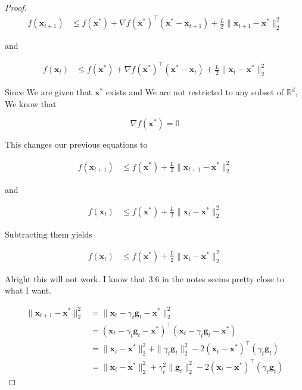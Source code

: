 \documentclass{article}
\begin{document}
\begin{proof}
	\begin{align}
		f(\mathbf{x}_{t+1}) &\le f(\mathbf{x}^*) + \nabla  f(\mathbf{x}^*)^\top (\mathbf{x}^* - \mathbf{x}_{t+1}) + \frac{L}{2}\|\mathbf{x}_{t+1} - \mathbf{x}^*\|^2_2
	\end{align}
	
	and
	
	\begin{align}
		f(\mathbf{x}_{t}) &\le f(\mathbf{x}^*) + \nabla  f(\mathbf{x}^*)^\top (\mathbf{x}^* - \mathbf{x}_{t}) + \frac{L}{2}\|\mathbf{x}_{t} - \mathbf{x}^*\|^2_2
	\end{align}
	
	Since We are given that $\mathbf{x}^*$ exists and We are not restricted to any subset of $\mathbb{R}^d$, We know that
	
	\[ \nabla f(\mathbf{x}^*) = 0 \]
	
	This changes our previous equations to 
	
	\begin{align}
		f(\mathbf{x}_{t+1}) &\le f(\mathbf{x}^*) + \frac{L}{2}\|\mathbf{x}_{t+1} - \mathbf{x}^*\|^2_2
	\end{align}
	
	and
	
	\begin{align}
		f(\mathbf{x}_{t}) &\le f(\mathbf{x}^*) + \frac{L}{2}\|\mathbf{x}_{t} - \mathbf{x}^*\|^2_2
	\end{align}
	
	Subtracting them yields
	
	\begin{align}
		f(\mathbf{x}_{t}) &\le f(\mathbf{x}^*) + \frac{L}{2}\|\mathbf{x}_{t} - \mathbf{x}^*\|^2_2
	\end{align}
	
	Alright this will not work.  I know that 3.6 in the notes seems pretty close to what I want. 
	
	\begin{align}
		\| \mathbf{x}_{t+1} - \mathbf{x}^*\|^2_2 &= \| \mathbf{x}_t - \gamma_t \mathbf{g}_t - \mathbf{x}^*\|_2^2\\
		&= (\mathbf{x}_t - \gamma_t \mathbf{g}_t - \mathbf{x}^*)^\top (\mathbf{x}_t - \gamma_t \mathbf{g}_t - \mathbf{x}^*) \\
		&= \|\mathbf{x}_t-\mathbf{x}^*\|^2_2 + \|\gamma_t\mathbf{g}_t\|^2_2 - 2(\mathbf{x}_t-\mathbf{x}^*)^\top(\gamma_t \mathbf{g}_t) \\
		&= \|\mathbf{x}_t-\mathbf{x}^*\|^2_2 + \gamma_t^2\| \mathbf{g}_t\|^2_2 - 2(\mathbf{x}_t-\mathbf{x}^*)^\top(\gamma_t \mathbf{g}_t) \label{basic_breakdown}
	\end{align}
	

\end{proof}
\end{document}

